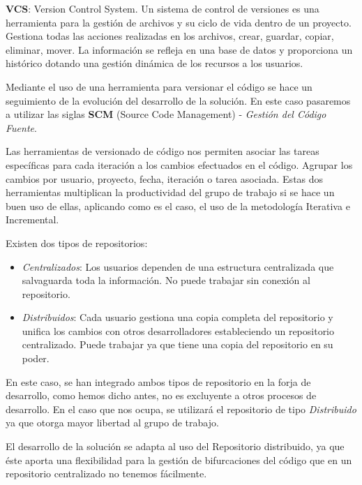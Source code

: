 \par \textbf{VCS}: Version Control System. Un sistema de control de versiones es una herramienta para la gestión de archivos y su ciclo de vida dentro de un proyecto. Gestiona todas las acciones realizadas en los archivos, crear, guardar, copiar, eliminar, mover. La información se refleja en una base de datos y proporciona un histórico dotando una gestión dinámica de los recursos a los usuarios.

\par Mediante el uso de una herramienta para versionar el código se hace un seguimiento de la evolución del desarrollo de la solución. En este caso pasaremos a utilizar las siglas \textbf{SCM} (Source Code Management) - \emph{Gestión del Código Fuente}.

\par Las herramientas de versionado de código nos permiten asociar las tareas específicas para cada iteración a los cambios efectuados en el código. Agrupar los cambios por usuario, proyecto, fecha, iteración o tarea asociada. Estas dos herramientas multiplican la productividad del grupo de trabajo si se hace un buen uso de ellas, aplicando como es el caso, el uso de la metodología Iterativa e Incremental.

\par Existen dos tipos de repositorios:

\begin{itemize}
	\item \emph{Centralizados}: Los usuarios dependen de una estructura centralizada que salvaguarda toda la información. No puede trabajar sin conexión al repositorio.
	\item \emph{Distribuidos}: Cada usuario gestiona una copia completa del repositorio y unifica los cambios con otros desarrolladores estableciendo un repositorio centralizado. Puede trabajar ya que tiene una copia del repositorio en su poder.
\end{itemize}

\par En este caso, se han integrado ambos tipos de repositorio en la forja de desarrollo, como hemos dicho antes, no es excluyente a otros procesos de desarrollo. En el caso que nos ocupa, se utilizará el repositorio de tipo \emph{Distribuido} ya que otorga mayor libertad al grupo de trabajo.

\par El desarrollo de la solución se adapta al uso del Repositorio distribuido, ya que éste aporta una flexibilidad para la gestión de bifurcaciones del código que en un repositorio centralizado no tenemos fácilmente. 

